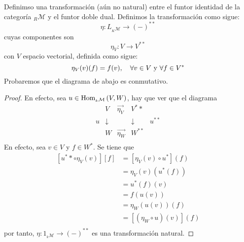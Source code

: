 \documentclass[12pt]{report}
\theoremstyle{largebreak}
\newcommand\cf[3]{\ensuremath{#1:#2\rightarrow#3}}
\newcommand{\Hom}[3]{\ensuremath{\textup{Hom}_{#1}\left(#2,#3\right)}}
\begin{document}
    \begin{exa}
        Definimso una transformación (aún no natural) entre el funtor identidad de la categoría $_R\mathcal{M}$ y el funtor doble dual. Definimos la transformación como sigue:
        \begin{equation*}
            \eta:L_{_K\mathcal{M}}\rightarrow (-)^{ **}
        \end{equation*}
        cuyas componentes son
        \begin{equation*}
            \eta_V:V\rightarrow V^{**}
        \end{equation*}
        con $V$ espacio vectorial, definida como sigue:
        \begin{equation*}
            \eta_V(v)(f)=f(v),\quad\forall v\in V\textup{ y }\forall f\in V^*
        \end{equation*}
        Probaremos que el diagrama de abajo es conmutativo.
    \end{exa}

    \begin{proof}
        En efecto, sea $u\in\Hom{_k\mathcal{M}}{V}{W}$, hay que ver que el diagrama
        \begin{equation*}
            \begin{array}{rcccl}
                &V & \overset{\longrightarrow}{\eta_V} & V^** &\\
                u & \downarrow & & \downarrow & u^{**} \\
                &W & \overset{\longrightarrow}{\eta_W} & W^{**} &\\
            \end{array}
        \end{equation*}
        En efecto, sea $v\in V$ y $f\in W^*$. Se tiene que
        \begin{equation*}
            \begin{split}
                [u^**\circ\eta_V(v)][f]&=[\eta_V(v)\circ u^*](f)\\
                &=\eta_V(v)(u^*(f))\\
                &=u^*(f)(v)\\
                &=f(u(v))\\
                &=\eta_W(u(v))(f)\\
                &=[(\eta_W\circ u)(v)](f)\\
            \end{split}
        \end{equation*}
        por tanto, $\cf{\eta}{1_{_k\mathcal{M}}}{(-)^{**}}$ es una transformación natural.
    \end{proof}
\end{document}
